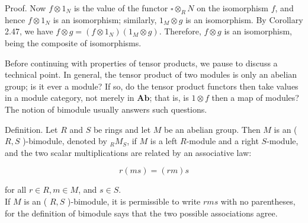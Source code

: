 \documentclass[10pt, letterpaper]{article}
\begin{document}
Proof. Now $f \otimes 1_{N}$ is the value of the functor $\square \otimes_{R} N$ on the isomorphism $f$, and hence $f \otimes 1_{N}$ is an isomorphism; similarly, $1_{M} \otimes g$ is an isomorphism. By Corollary 2.47, we have $f \otimes g=\left(f \otimes 1_{N}\right)\left(1_{M} \otimes g\right)$. Therefore, $f \otimes g$ is an isomorphism, being the composite of isomorphisms.

Before continuing with properties of tensor products, we pause to discuss a technical point. In general, the tensor product of two modules is only an abelian group; is it ever a module? If so, do the tensor product functors then take values in a module category, not merely in $\mathbf{A b}$; that is, is $1 \otimes f$ then a map of modules? The notion of bimodule usually answers such questions.

Definition. Let $R$ and $S$ be rings and let $M$ be an abelian group. Then $M$ is an ( $R, S$ )-bimodule, denoted by ${ }_{R} M_{S}$, if $M$ is a left $R$-module and a right $S$-module, and the two scalar multiplications are related by an associative law:

$$
r(m s)=(r m) s
$$

for all $r \in R, m \in M$, and $s \in S$.\\
If $M$ is an ( $R, S$ )-bimodule, it is permissible to write $r m s$ with no parentheses, for the definition of bimodule says that the two possible associations agree.
\end{document}
